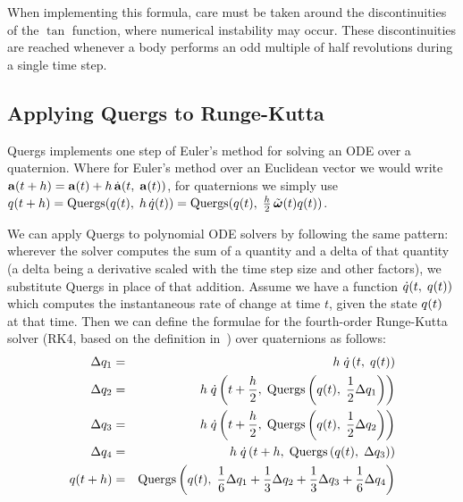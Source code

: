 When implementing this formula, care must be taken around the discontinuities of the $\tan$
function, where numerical instability may occur. These discontinuities are reached whenever a
body performs an odd multiple of half revolutions during a single time step.


\subsection{Applying Quergs to Runge-Kutta\label{quergsRK4}}

Quergs implements one step of Euler's method for solving an ODE over a quaternion.
Where for Euler's method over an Euclidean vector we would write
$\ve{a}(t + h) = \ve{a}(t) + h\,\dot{\ve{a}}(t,\;\ve{a}(t))$,
for quaternions we simply use
$\q{q}(t + h) = \mathrm{Quergs}(\q{q}(t),\; h\,\dot{\q{q}}(t)) =
    \mathrm{Quergs}(\q{q}(t),\; \frac{h}{2}\,\tilde{\ve{\omega}}(t)\q{q}(t))$.

We can apply Quergs to polynomial ODE solvers by following the same pattern: wherever the solver
computes the sum of a quantity and a delta of that quantity (a delta being a derivative
scaled with the time step size and other factors), we substitute Quergs in place of that
addition. Assume we have a function $\dot{q}(t,\; q(t))$ which computes the
instantaneous rate of change at time $t$, given the state $q(t)$ at that time. Then we can
define the formulae for the fourth-order Runge-Kutta solver (RK4, based on the definition
in~\cite{NRinC}) over quaternions as follows:
\begin{eqnarray}
\Delta q_1 & = & h\;\dot{q}\left(t,\;q(t)\right) \nonumber\\
\Delta q_2 & = & h\;\dot{q}\left(t + \frac{h}{2},\;
    \mathrm{Quergs}\left(q(t),\; \frac{1}{2}\Delta q_1\right)\right) \nonumber\\
\Delta q_3 & = & h\;\dot{q}\left(t + \frac{h}{2},\;
    \mathrm{Quergs}\left(q(t),\; \frac{1}{2}\Delta q_2\right)\right) \nonumber\\
\Delta q_4 & = & h\;\dot{q}\left(t + h,\;
    \mathrm{Quergs}\left(q(t),\; \Delta q_3\right)\right) \nonumber\\
q(t + h) & = & \mathrm{Quergs}\left(q(t),\;
    \frac{1}{6}\Delta q_1 + \frac{1}{3}\Delta q_2 +
    \frac{1}{3}\Delta q_3 + \frac{1}{6}\Delta q_4\right)
\end{eqnarray}

